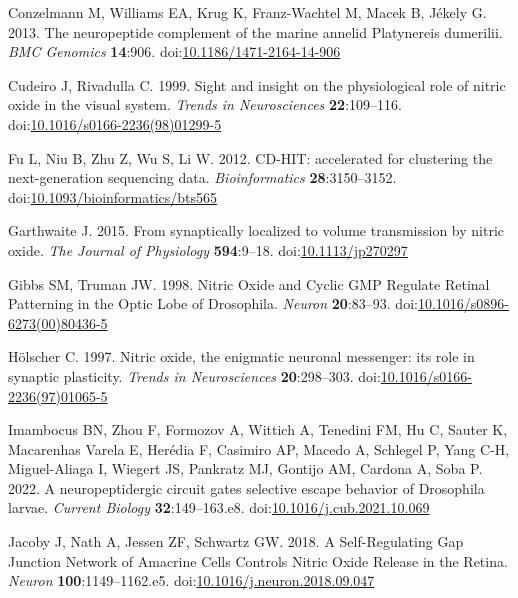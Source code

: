 \documentclass[
  10pt,
  onecolumn]{article}
\newlength{\cslhangindent}
\newlength{\cslentryspacingunit} %
\newenvironment{CSLReferences}[2] %
 {%
  \setlength{\parindent}{0pt}
  \ifodd #1
  \let\oldpar\par
  \def\par{\hangindent=\cslhangindent\oldpar}
  \fi
  \setlength{\parskip}{#2\cslentryspacingunit}
 }%
 {}
\begin{document}
\begin{CSLReferences}{1}{0}
\leavevmode{}%
Conzelmann M, Williams EA, Krug K, Franz-Wachtel M, Macek B, Jékely G.
2013. The neuropeptide complement of the marine annelid Platynereis
dumerilii. \emph{BMC Genomics} \textbf{14}:906.
doi:\href{https://doi.org/10.1186/1471-2164-14-906}{10.1186/1471-2164-14-906}

\leavevmode{}%
Cudeiro J, Rivadulla C. 1999. Sight and insight {\textendash} on the
physiological role of nitric oxide in the visual system. \emph{Trends in
Neurosciences} \textbf{22}:109--116.
doi:\href{https://doi.org/10.1016/s0166-2236(98)01299-5}{10.1016/s0166-2236(98)01299-5}

\leavevmode{}%
Fu L, Niu B, Zhu Z, Wu S, Li W. 2012. CD-HIT: accelerated for clustering
the next-generation sequencing data. \emph{Bioinformatics}
\textbf{28}:3150--3152.
doi:\href{https://doi.org/10.1093/bioinformatics/bts565}{10.1093/bioinformatics/bts565}

\leavevmode{}%
Garthwaite J. 2015. From synaptically localized to volume transmission
by nitric oxide. \emph{The Journal of Physiology} \textbf{594}:9--18.
doi:\href{https://doi.org/10.1113/jp270297}{10.1113/jp270297}

\leavevmode{}%
Gibbs SM, Truman JW. 1998. Nitric Oxide and Cyclic GMP Regulate Retinal
Patterning in the Optic Lobe of Drosophila. \emph{Neuron}
\textbf{20}:83--93.
doi:\href{https://doi.org/10.1016/s0896-6273(00)80436-5}{10.1016/s0896-6273(00)80436-5}

\leavevmode{}%
Hölscher C. 1997. Nitric oxide, the enigmatic neuronal messenger: its
role in synaptic plasticity. \emph{Trends in Neurosciences}
\textbf{20}:298--303.
doi:\href{https://doi.org/10.1016/s0166-2236(97)01065-5}{10.1016/s0166-2236(97)01065-5}

\leavevmode{}%
Imambocus BN, Zhou F, Formozov A, Wittich A, Tenedini FM, Hu C, Sauter
K, Macarenhas Varela E, Herédia F, Casimiro AP, Macedo A, Schlegel P,
Yang C-H, Miguel-Aliaga I, Wiegert JS, Pankratz MJ, Gontijo AM, Cardona
A, Soba P. 2022. A neuropeptidergic circuit gates selective escape
behavior of Drosophila larvae. \emph{Current Biology}
\textbf{32}:149--163.e8.
doi:\href{https://doi.org/10.1016/j.cub.2021.10.069}{10.1016/j.cub.2021.10.069}

\leavevmode{}%
Jacoby J, Nath A, Jessen ZF, Schwartz GW. 2018. A Self-Regulating Gap
Junction Network of Amacrine Cells Controls Nitric Oxide Release in the
Retina. \emph{Neuron} \textbf{100}:1149--1162.e5.
doi:\href{https://doi.org/10.1016/j.neuron.2018.09.047}{10.1016/j.neuron.2018.09.047}


\end{CSLReferences}
\end{document}
